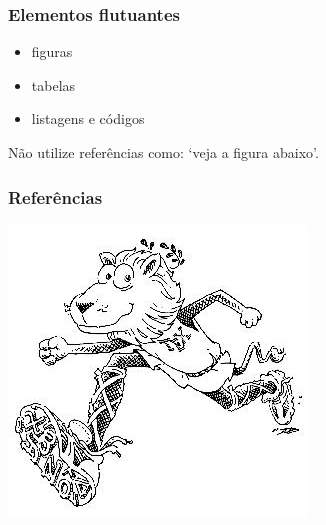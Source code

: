 \documentclass[10pt,notes,compress,aspectratio=169]{beamer}
\begin{document}
\begin{frame}
\frametitle{Elementos flutuantes}
\begin{itemize}
\item figuras
\item tabelas
\item listagens e códigos
\end{itemize}

\vspace{3ex}
Não utilize referências como:  `veja a figura abaixo'.
\end{frame}







\begin{frame}[allowframebreaks]
\frametitle{Referências}
\printbibliography

\vspace{3ex}
\begin{flushright}
\includegraphics[width=0.15\linewidth,height=0.3\textheight,keepaspectratio]{figures/lion04.png}
\end{flushright}
\end{frame}


\end{document}
